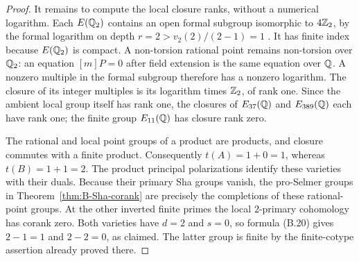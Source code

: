 \begin{proof}
It remains to compute the local closure ranks, without a numerical
logarithm.  Each \(E(\mathbb Q_2)\) contains an open formal subgroup
isomorphic to \(4\mathbb Z_2\), by the formal logarithm on depth
\(r=2>v_2(2)/(2-1)=1\)
\citep[Theorem~IV.6.4(b), p.~132, and Proposition~VII.2.2,
p.~191]{BSilverman2009Local}.
It has finite index because \(E(\mathbb Q_2)\) is compact.
A non-torsion rational point remains non-torsion over \(\mathbb Q_2\):
an equation \([m]P=0\) after field extension is the same equation
over \(\mathbb Q\).  A nonzero multiple in the formal subgroup therefore
has a nonzero logarithm.  The closure of its integer multiples is
its logarithm times \(\mathbb Z_2\), of rank one.  Since the ambient
local group itself has rank one, the closures of \(E_{37}(\mathbb Q)\)
and \(E_{389}(\mathbb Q)\) each have rank one; the finite group
\(E_{11}(\mathbb Q)\) has closure rank zero.

The rational and local point groups of a product are products,
and closure commutes with a finite product.  Consequently
\(t(A)=1+0=1\), whereas \(t(B)=1+1=2\).  The product
principal polarizations identify these varieties with their duals.
Because their primary Sha groups vanish, the pro-Selmer groups
in Theorem~\ref{thm:B-Sha-corank} are precisely the completions
of these rational-point groups.  At the other inverted finite
primes the local \(2\)-primary cohomology has corank zero.
Both varieties have \(d=2\) and \(s=0\), so formula (B.20)
gives \(2-1=1\) and \(2-2=0\), as claimed.  The latter group
is finite by the finite-cotype assertion already proved there.
\end{proof}
